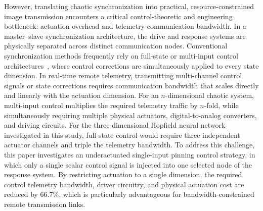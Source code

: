 \documentclass[a4paper,fleqn]{cas-dc}
\theoremstyle{plain}
\theoremstyle{definition}
\begin{document}
However, translating chaotic synchronization into practical, resource-constrained image transmission encounters a critical control-theoretic and engineering bottleneck: actuation overhead and telemetry communication bandwidth. In a master--slave synchronization architecture, the drive and response systems are physically separated across distinct communication nodes. Conventional synchronization methods frequently rely on full-state or multi-input control architectures~\cite{yassen2005controlling,feki2009sliding,su2021fixed}, where control corrections are simultaneously applied to every state dimension. In real-time remote telemetry, transmitting multi-channel control signals or state corrections requires communication bandwidth that scales directly and linearly with the actuation dimension. For an $n$-dimensional chaotic system, multi-input control multiplies the required telemetry traffic by $n$-fold, while simultaneously requiring multiple physical actuators, digital-to-analog converters, and driving circuits. For the three-dimensional Hopfield neural network investigated in this study, full-state control would require three independent actuator channels and triple the telemetry bandwidth. To address this challenge, this paper investigates an underactuated single-input pinning control strategy, in which only a single scalar control signal is injected into one selected node of the response system. By restricting actuation to a single dimension, the required control telemetry bandwidth, driver circuitry, and physical actuation cost are reduced by 66.7\%, which is particularly advantageous for bandwidth-constrained remote transmission links.
\end{document}
